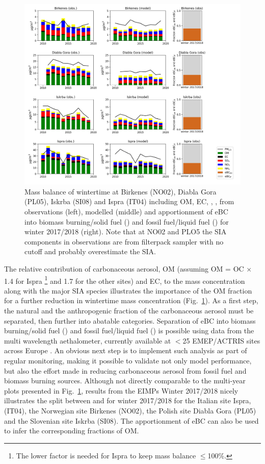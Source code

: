 \begin{figure}
\includegraphics[width=16cm]{FIGS_TRENDS/Compostion_4sites_winter.png}
 \caption{
  Mass balance of wintertime \pmfine at  Birkenes (NO02), Diabla Gora
  (PL05), Iskrba (SI08) and Ispra (IT04) including OM, EC, , ,  from 
  observations (left), modelled (middle) and apportionment of eBC
  into biomass burning/solid fuel (\EBCff) and fossil fuel/liquid fuel
  (\EBCbb) for winter 2017/2018 (right). Note that at NO02 and PLO5 the SIA components in observations are from filterpack sampler with no cutoff and probably overestimate the \pmfine SIA. \label{fig:KEX4}
 }
\end{figure}


The relative contribution of carbonaceous aerosol, OM (assuming OM = OC $\times$
1.4 for Ispra
\footnote{The lower factor is needed for Ispra to keep mass balance $\le$100\%.}
and 1.7 for the other sites)
 and EC, to the \pmfine mass concentration along with the major
SIA species illustrates the importance of the OM fraction for a further
reduction in wintertime \pmfine mass concentration (Fig.~\ref{fig:KEX4}). As a first step,
the natural and the anthropogenic fraction of the carbonaceous aerosol
must be separated, then further into abatable categories. Separation of
eBC into biomass burning/solid fuel (\EBCbb) and fossil fuel/liquid fuel
(\EBCff) is possible using data from the multi wavelength aethalometer,
currently available at $<$25 EMEP/ACTRIS sites across Europe \citep{Yttri:2014,Platt:2020a,Platt:2020b,Platt20XX}. An obvious next
step is to implement such analysis as part of regular monitoring,
making it possible to validate not only model performance, but also the
effort made in reducing carbonaceous aerosol from fossil fuel and biomass
burning sources. Although not directly comparable to the multi-year plots
presented in Fig.~\ref{fig:KEX4}, results from the EIMPs Winter 2017/2018 nicely
illustrates the split between \EBCbb and \EBCff for winter 2017/2018 for
the Italian site Ispra, (IT04), the Norwegian site Birkenes (NO02), the
Polish site Diabla Gora (PL05) and the Slovenian site Iskrba (SI08). The
apportionment of eBC can also be used to infer the corresponding fractions
of OM.

